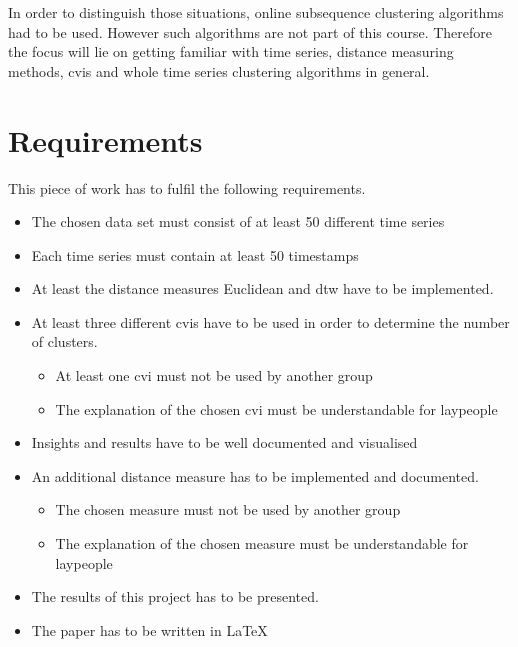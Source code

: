 In order to distinguish those situations, online subsequence clustering algorithms had to be used. However such algorithms are not part of this course. Therefore the focus will lie on getting familiar with time series, distance measuring methods, \acp{cvi} and whole time series clustering algorithms in general.


\clearpage
\section{Requirements}

This piece of work has to fulfil the following requirements.

\begin{itemize}
  \item The chosen data set must consist of at least 50 different time series
  \item Each time series must contain at least 50 timestamps
  \item At least the distance measures Euclidean and \ac{dtw} have to be implemented.
  \item At least three different \acp{cvi} have to be used in order to determine the number of clusters.
  \begin{itemize}
  	\item At least one \ac{cvi} must not be used by another group
  	\item The explanation of the chosen \ac{cvi} must be understandable for laypeople
  \end{itemize}
  \item Insights and results have to be well documented and visualised
  \item An additional distance measure has to be implemented and documented.
  \begin{itemize}
  	\item The chosen measure must not be used by another group
  	\item The explanation of the chosen measure must be understandable for laypeople
  \end{itemize}
  \item The results of this project has to be presented.
  \item The paper has to be written in LaTeX
  
\end{itemize}

